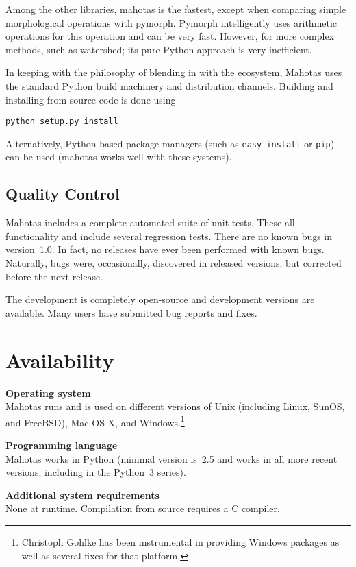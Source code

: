 \documentclass{scrartcl}
\newcommand*{\cpp}{{C\nolinebreak[4]\hspace{-.05em}\raisebox{.4ex}{\tiny\textbf{++}}}}
\begin{document}
Among the other libraries, mahotas is the fastest, except when comparing simple
morphological operations with pymorph. Pymorph intelligently uses arithmetic
operations for this operation and can be very fast. However, for more complex
methods, such as watershed; its pure Python approach is very inefficient.

\bigskip

In keeping with the philosophy of blending in with the ecosystem, Mahotas uses
the standard Python build machinery and distribution channels. Building and
installing from source code is done using
\begin{verbatim}
python setup.py install
\end{verbatim}
Alternatively, Python based package managers (such as \texttt{easy\_install} or
\texttt{pip}) can be used (mahotas works well with these systems).

\subsection{Quality Control}

Mahotas includes a complete automated suite of unit tests. These all
functionality and include several regression tests. There are no known bugs in
version~1.0. In fact, no releases have ever been performed with known bugs.
Naturally, bugs were, occasionally, discovered in released versions, but
corrected before the next release.

The development is completely open-source and development versions are
available. Many users have submitted bug reports and fixes.

\section{Availability}

\textbf{Operating system}\\
Mahotas runs and is used on different versions of Unix (including Linux, SunOS,
and FreeBSD), Mac OS X, and Windows.\footnote{Christoph Gohlke has been
instrumental in providing Windows packages as well as several fixes for that
platform.}


\textbf{Programming language}\\
Mahotas works in Python (minimal version is~2.5 and works in all more recent
versions, including in the Python~3 series).

\textbf{Additional system requirements}\\
None at runtime. Compilation from source requires a \cpp{} compiler.
\end{document}
